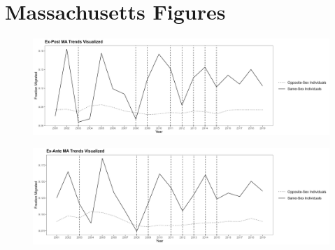 \documentclass[12pt,letterpaper]{article}
\begin{document}
\clearpage
\newpage
\section{Massachusetts Figures}
\begin{figure}[h]
    \centering
    \includegraphics[width=0.75\linewidth]{outputs/summary_stats/MA_post_trends.png}
    \caption{}
    \label{fig: MA_post_trends}
\end{figure}

\begin{figure}[h]
    \centering
    \includegraphics[width=0.75\linewidth]{outputs/summary_stats/MA_ante_trends.png}
    \caption{}
    \label{fig: MA_ante_trends}
\end{figure}
\end{document}
